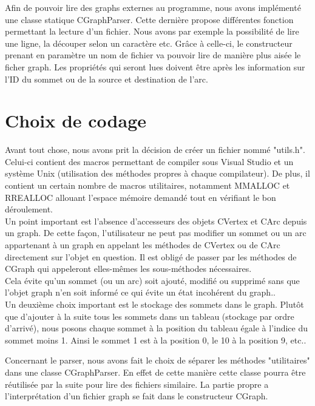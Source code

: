 		
		Afin de pouvoir lire des graphs externes au programme, nous avons implémenté une classe statique CGraphParser. Cette dernière propose différentes fonction permettant la lecture d'un fichier. Nous avons par exemple la possibilité de lire une ligne, la découper selon un caractère etc. Grâce à celle-ci, le constructeur prenant en paramètre un nom de fichier va pouvoir lire de manière plus aisée le ficher graph. Les propriétés qui seront lues doivent être après les information sur l'ID du sommet ou de la source et destination de l'arc.
		
		
	\chapter{Choix de codage}
		Avant tout chose, nous avons prit la décision de créer un fichier nommé "utils.h". Celui-ci contient des macros permettant de compiler sous Visual Studio et un système Unix (utilisation des méthodes propres à chaque compilateur). De plus, il contient un certain nombre de macros utilitaires, notamment MMALLOC et RREALLOC allouant l'espace mémoire demandé tout en vérifiant le bon déroulement.\\
	
		Un point important est l'absence d'accesseurs des objets CVertex et CArc depuis un graph. De cette façon, l'utilisateur ne peut pas modifier un sommet ou un arc appartenant à un graph en appelant les méthodes de CVertex ou de CArc directement sur l'objet en question. Il est obligé de passer par les méthodes de CGraph qui appeleront elles-mêmes les sous-méthodes nécessaires.\\
		Cela évite qu'un sommet (ou un arc) soit ajouté, modifié ou supprimé sans que l'objet graph n'en soit informé ce qui évite un état incohérent du graph..\\
		
		Un deuxième choix important est le stockage des sommets dans le graph. Plutôt que d'ajouter à la suite tous les sommets dans un tableau (stockage par ordre d'arrivé), nous posons chaque sommet à la position du tableau égale à l'indice du sommet moins 1. Ainsi le sommet 1 est à la position 0, le 10 à la position 9, etc..
		
	
		Concernant le parser, nous avons fait le choix de séparer les méthodes "utilitaires" dans une classe CGraphParser. En effet de cette manière cette classe pourra être réutilisée par la suite pour lire des fichiers similaire. La partie propre a l'interprétation d'un fichier graph se fait dans le constructeur CGraph.
		
